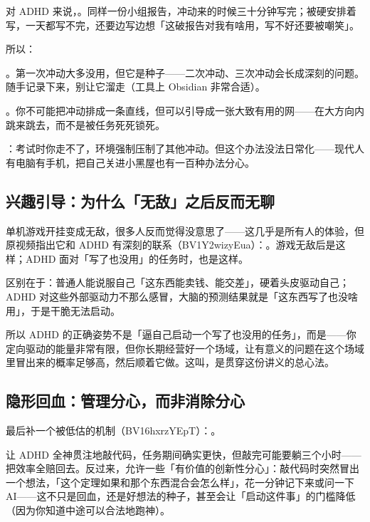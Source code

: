 对 ADHD 来说，。同样一份小组报告，冲动来的时候三十分钟写完；被硬安排着写，一天都写不完，还要边写边想「这破报告对我有啥用，写不好还要被嘲笑」。

所以：

\begin{checklist}
  \item {}。第一次冲动大多没用，但它是种子——二次冲动、三次冲动会长成深刻的问题。随手记录下来，别让它溜走（工具上 Obsidian 非常合适）。
  \item {}。你不可能把冲动排成一条直线，但可以引导成一张大致有用的网——在大方向内跳来跳去，而不是被任务死死锁死。
  \item {}：考试时你走不了，环境强制压制了其他冲动。但这个办法没法日常化——现代人有电脑有手机，把自己关进小黑屋也有一百种办法分心。
\end{checklist}

\subsection{兴趣引导：为什么「无敌」之后反而无聊}

单机游戏开挂变成无敌，很多人反而觉得没意思了——这几乎是所有人的体验，但原视频指出它和 ADHD 有深刻的联系（BV1Y2wizyEua）：。游戏无敌后是这样；ADHD 面对「写了也没用」的任务时，也是这样。

区别在于：普通人能说服自己「这东西能卖钱、能交差」，硬着头皮驱动自己；ADHD 对这些外部驱动力不那么感冒，大脑的预测结果就是「这东西写了也没啥用」，于是干脆无法启动。

\begin{insight}
所以 ADHD 的正确姿势不是「逼自己启动一个写了也没用的任务」，而是——你定向驱动的能量非常有限，但你长期经营好一个场域，让有意义的问题在这个场域里冒出来的概率足够高，然后顺着它做。这叫，是贯穿这份讲义的总心法。
\end{insight}

\subsection{隐形回血：管理分心，而非消除分心}

最后补一个被低估的机制（BV16hxrzYEpT）：。

让 ADHD 全神贯注地敲代码，任务期间确实更快，但敲完可能要躺三个小时——把效率全赔回去。反过来，允许一些「有价值的创新性分心」：敲代码时突然冒出一个想法，「这个定理如果和那个东西混合会怎么样」，花一分钟记下来或问一下 AI——这不只是回血，还是好想法的种子，甚至会让「启动这件事」的门槛降低（因为你知道中途可以合法地跑神）。

